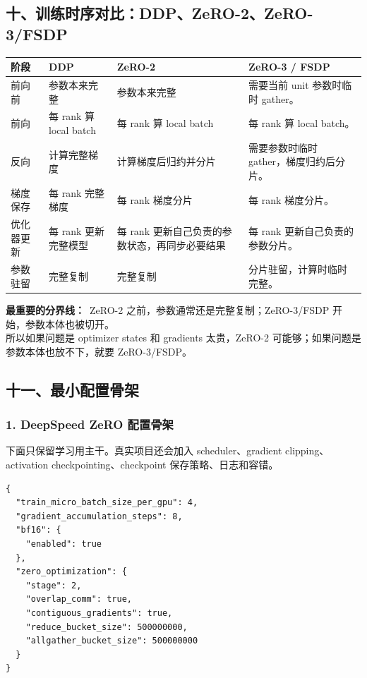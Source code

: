 \subsection{十、训练时序对比：DDP、ZeRO-2、ZeRO-3/FSDP}

\begin{center}
{\small
\begin{tabular}{p{2.6cm}p{3.5cm}p{3.7cm}p{3.7cm}}
\hline
\textbf{阶段} & \textbf{DDP} & \textbf{ZeRO-2} & \textbf{ZeRO-3 / FSDP} \\
\hline
前向前 & 参数本来完整 & 参数本来完整 & 需要当前 unit 参数时临时 gather。 \\
前向 & 每 rank 算 local batch & 每 rank 算 local batch & 每 rank 算 local batch。 \\
反向 & 计算完整梯度 & 计算梯度后归约并分片 & 需要参数时临时 gather，梯度归约后分片。 \\
梯度保存 & 每 rank 完整梯度 & 每 rank 梯度分片 & 每 rank 梯度分片。 \\
优化器更新 & 每 rank 更新完整模型 & 每 rank 更新自己负责的参数状态，再同步必要结果 & 每 rank 更新自己负责的参数分片。 \\
参数驻留 & 完整复制 & 完整复制 & 分片驻留，计算时临时完整。 \\
\hline
\end{tabular}
}
\end{center}

\begin{summarybox}
\textbf{最重要的分界线：}\
ZeRO-2 之前，参数通常还是完整复制；ZeRO-3/FSDP 开始，参数本体也被切开。\\
所以如果问题是 optimizer states 和 gradients 太贵，ZeRO-2 可能够；如果问题是参数本体也放不下，就要 ZeRO-3/FSDP。
\end{summarybox}

\subsection{十一、最小配置骨架}

\subsubsection*{1. DeepSpeed ZeRO 配置骨架}

下面只保留学习用主干。真实项目还会加入 scheduler、gradient clipping、activation checkpointing、checkpoint 保存策略、日志和容错。

\begin{lstlisting}[language={}, caption=DeepSpeed ZeRO-2/ZeRO-3 配置骨架]
{
  "train_micro_batch_size_per_gpu": 4,
  "gradient_accumulation_steps": 8,
  "bf16": {
    "enabled": true
  },
  "zero_optimization": {
    "stage": 2,
    "overlap_comm": true,
    "contiguous_gradients": true,
    "reduce_bucket_size": 500000000,
    "allgather_bucket_size": 500000000
  }
}
\end{lstlisting}

